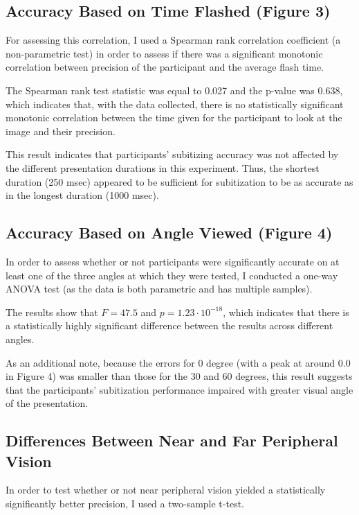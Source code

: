 \documentclass[12pt]{article}
\begin{document}
\subsection{Accuracy Based on Time Flashed (Figure 3)}

For assessing this correlation, I used a Spearman rank correlation coefficient
(a non-parametric test) in order to assess if there was a significant monotonic
correlation between precision of the participant and the average flash time.

The Spearman rank test statistic was equal to 0.027 and the p-value was 0.638,
which indicates that, with the data collected, there is no statistically
significant monotonic correlation between the time given for the
participant to look at the image and their precision.

This result indicates that participants’ subitizing accuracy was not affected
by the different presentation durations in this experiment. Thus, the shortest
duration (250 msec) appeared to be sufficient for subitization to be as
accurate as in the longest duration (1000 msec).

\subsection{Accuracy Based on Angle Viewed (Figure 4)}

In order to assess whether or not participants were significantly accurate on
at least one of the three angles at which they were tested, I conducted
a one-way ANOVA test (as the data is both parametric and has multiple samples).

The results show that $F=47.5$ and $p = 1.23 \cdot 10^{-18}$, which indicates
that there is a statistically highly significant difference between the results
across different angles.

As an additional note, because the errors for 0 degree (with a peak at around
$0.0$ in Figure 4) was smaller than those for the 30 and 60 degrees,
this result suggests that the participants’ subitization performance
impaired with greater visual angle of the presentation.

\subsection{Differences Between Near and Far Peripheral Vision}

In order to test whether or not near peripheral vision yielded a statistically
significantly better precision, I used a two-sample t-test.
\end{document}

